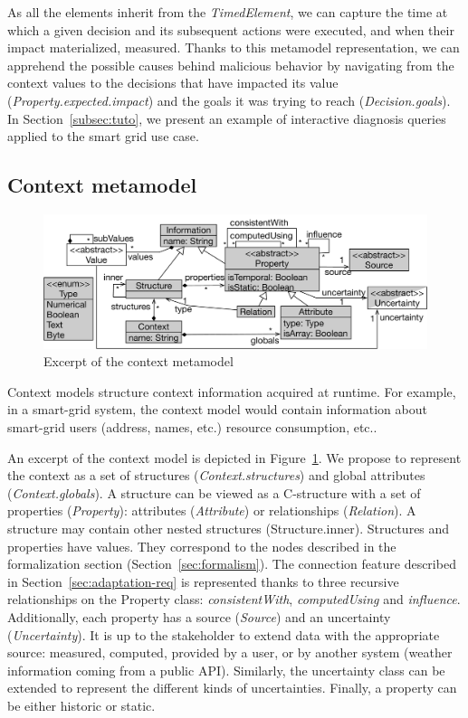 As all the elements inherit from the \textit{TimedElement}, we can capture the time at which a given decision and its subsequent actions were executed, and when their impact materialized, \ie measured. Thanks to this metamodel representation, we can apprehend the possible causes behind malicious behavior by navigating from the context values to the decisions that have impacted its value (\textit{Property.expected.impact}) and the goals it was trying to reach (\textit{Decision.goals}). In Section~\ref{subsec:tuto}, we present an example of interactive diagnosis queries applied to the smart grid use case.

\subsection{Context metamodel}
\begin{figure}
  \begin{center}
      \includegraphics[width=.8\linewidth]{img/chapt-tkm/mm/contextModel}
      \caption{Excerpt of the context metamodel}
      \label{fig:context-model}
  \end{center}	
\end{figure}

Context models structure context information acquired at runtime. 
For example, in a smart-grid system, the context model would contain information about smart-grid users (address, names, etc.) resource consumption, etc..

An excerpt of the context model is depicted in Figure~\ref{fig:context-model}. We propose to represent the context as a set of structures (\textit{Context.structures}) and global attributes (\textit{Context.globals}). A structure can be viewed as a C-structure with a set of properties (\textit{Property}): attributes (\textit{Attribute}) or relationships (\textit{Relation}).  A structure may contain other nested structures (Structure.inner).  
Structures and properties have values. They correspond to the nodes described in the formalization section (\cf Section~\ref{sec:formalism}). The connection feature described in Section~\ref{sec:adaptation-req} is represented thanks to three recursive relationships on the Property class: \textit{consistentWith}, \textit{computedUsing} and \textit{influence}. Additionally, each property has a source (\textit{Source}) and an uncertainty (\textit{Uncertainty}). It is up to the stakeholder to extend data with the appropriate source: measured, computed, provided by a user, or by another system (\eg weather information coming from a public API).
Similarly, the uncertainty class can be extended to represent the different kinds of uncertainties. Finally, a property can be either historic or static.


